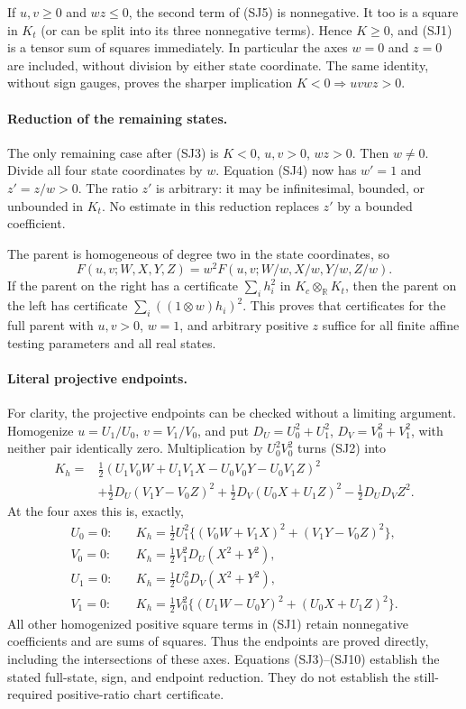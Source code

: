 If $u,v\geq0$ and $wz\leq0$, the second term of (SJ5) is nonnegative.
It too is a square in $K_t$ (or can be split into its three nonnegative
terms).  Hence $K\geq0$, and (SJ1) is a tensor sum of squares immediately.
In particular the axes $w=0$ and $z=0$ are included, without division by
either state coordinate.  The same identity, without sign gauges, proves
the sharper implication $K<0\Longrightarrow uvwz>0$.

\paragraph{Reduction of the remaining states.}
The only remaining case after (SJ3) is $K<0$, $u,v>0$, $wz>0$.
Then $w\ne0$.  Divide all four state coordinates by $w$.  Equation (SJ4)
now has $w'=1$ and $z'=z/w>0$.  The ratio $z'$ is arbitrary: it may be
infinitesimal, bounded, or unbounded in $K_t$.  No estimate in this
reduction replaces $z'$ by a bounded coefficient.

The parent is homogeneous of degree two in the state coordinates, so
\[
 F(u,v;W,X,Y,Z)=w^2F(u,v;W/w,X/w,Y/w,Z/w).               \tag{SJ8}
\]
If the parent on the right has a certificate $\sum_i h_i^2$ in
$K_c\otimes_{\mathbb R}K_t$, then the parent on the left has certificate
$\sum_i((1\otimes w)h_i)^2$.  This proves that certificates for the full
parent with $u,v>0$, $w=1$, and arbitrary positive $z$ suffice for all
finite affine testing parameters and all real states.

\paragraph{Literal projective endpoints.}
For clarity, the projective endpoints can be checked without a limiting
argument.  Homogenize $u=U_1/U_0$, $v=V_1/V_0$, and put
$D_U=U_0^2+U_1^2$, $D_V=V_0^2+V_1^2$, with neither pair identically zero.
Multiplication by $U_0^2V_0^2$ turns (SJ2) into
\begin{align}
 K_h={}&\tfrac12(U_1V_0W+U_1V_1X-U_0V_0Y-U_0V_1Z)^2\\
       &+\tfrac12D_U(V_1Y-V_0Z)^2
        +\tfrac12D_V(U_0X+U_1Z)^2-\tfrac12D_UD_VZ^2.     \tag{SJ9}
\end{align}
At the four axes this is, exactly,
\begin{align}
 U_0=0:\quad &K_h=\tfrac12U_1^2\{(V_0W+V_1X)^2+(V_1Y-V_0Z)^2\},\\
 V_0=0:\quad &K_h=\tfrac12V_1^2D_U(X^2+Y^2),\\
 U_1=0:\quad &K_h=\tfrac12U_0^2D_V(X^2+Y^2),\\
 V_1=0:\quad &K_h=\tfrac12V_0^2\{(U_1W-U_0Y)^2+(U_0X+U_1Z)^2\}.
                                                               \tag{SJ10}
\end{align}
All other homogenized positive square terms in (SJ1) retain nonnegative coefficients
and are sums of squares.  Thus the endpoints are proved directly,
including the intersections of these axes.  Equations (SJ3)--(SJ10)
establish the stated full-state, sign, and endpoint reduction.  They do
not establish the still-required positive-ratio chart certificate.


